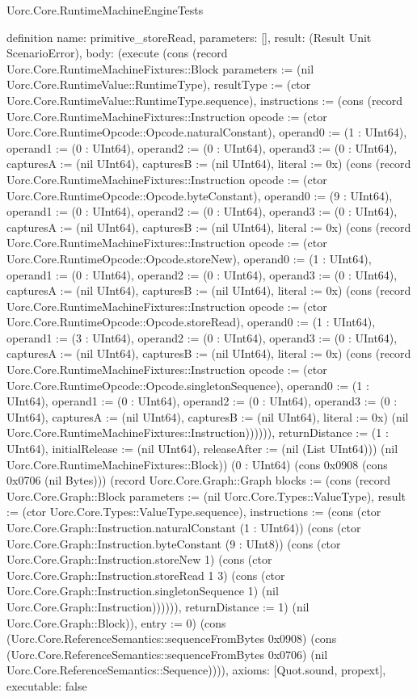 \begin{lexlean}{Uorc.Core.RuntimeMachineEngineTests}
\begin{semanticmodule}
definition{
  name: primitive_storeRead,
  parameters: [],
  result: (Result Unit ScenarioError),
  body: (execute (cons (record Uorc.Core.RuntimeMachineFixtures::Block {parameters := (nil Uorc.Core.RuntimeValue::RuntimeType), resultType := (ctor Uorc.Core.RuntimeValue::RuntimeType.sequence), instructions := (cons (record Uorc.Core.RuntimeMachineFixtures::Instruction {opcode := (ctor Uorc.Core.RuntimeOpcode::Opcode.naturalConstant), operand0 := (1 : UInt64), operand1 := (0 : UInt64), operand2 := (0 : UInt64), operand3 := (0 : UInt64), capturesA := (nil UInt64), capturesB := (nil UInt64), literal := 0x}) (cons (record Uorc.Core.RuntimeMachineFixtures::Instruction {opcode := (ctor Uorc.Core.RuntimeOpcode::Opcode.byteConstant), operand0 := (9 : UInt64), operand1 := (0 : UInt64), operand2 := (0 : UInt64), operand3 := (0 : UInt64), capturesA := (nil UInt64), capturesB := (nil UInt64), literal := 0x}) (cons (record Uorc.Core.RuntimeMachineFixtures::Instruction {opcode := (ctor Uorc.Core.RuntimeOpcode::Opcode.storeNew), operand0 := (1 : UInt64), operand1 := (0 : UInt64), operand2 := (0 : UInt64), operand3 := (0 : UInt64), capturesA := (nil UInt64), capturesB := (nil UInt64), literal := 0x}) (cons (record Uorc.Core.RuntimeMachineFixtures::Instruction {opcode := (ctor Uorc.Core.RuntimeOpcode::Opcode.storeRead), operand0 := (1 : UInt64), operand1 := (3 : UInt64), operand2 := (0 : UInt64), operand3 := (0 : UInt64), capturesA := (nil UInt64), capturesB := (nil UInt64), literal := 0x}) (cons (record Uorc.Core.RuntimeMachineFixtures::Instruction {opcode := (ctor Uorc.Core.RuntimeOpcode::Opcode.singletonSequence), operand0 := (1 : UInt64), operand1 := (0 : UInt64), operand2 := (0 : UInt64), operand3 := (0 : UInt64), capturesA := (nil UInt64), capturesB := (nil UInt64), literal := 0x}) (nil Uorc.Core.RuntimeMachineFixtures::Instruction)))))), returnDistance := (1 : UInt64), initialRelease := (nil UInt64), releaseAfter := (nil (List UInt64))}) (nil Uorc.Core.RuntimeMachineFixtures::Block)) (0 : UInt64) (cons 0x0908 (cons 0x0706 (nil Bytes))) (record Uorc.Core.Graph::Graph {blocks := (cons (record Uorc.Core.Graph::Block {parameters := (nil Uorc.Core.Types::ValueType), result := (ctor Uorc.Core.Types::ValueType.sequence), instructions := (cons (ctor Uorc.Core.Graph::Instruction.naturalConstant (1 : UInt64)) (cons (ctor Uorc.Core.Graph::Instruction.byteConstant (9 : UInt8)) (cons (ctor Uorc.Core.Graph::Instruction.storeNew 1) (cons (ctor Uorc.Core.Graph::Instruction.storeRead 1 3) (cons (ctor Uorc.Core.Graph::Instruction.singletonSequence 1) (nil Uorc.Core.Graph::Instruction)))))), returnDistance := 1}) (nil Uorc.Core.Graph::Block)), entry := 0}) (cons (Uorc.Core.ReferenceSemantics::sequenceFromBytes 0x0908) (cons (Uorc.Core.ReferenceSemantics::sequenceFromBytes 0x0706) (nil Uorc.Core.ReferenceSemantics::Sequence)))),
  axioms: [Quot.sound, propext],
  executable: false
}


\end{semanticmodule}
\end{lexlean}
